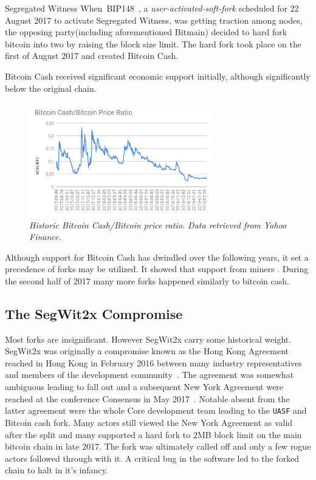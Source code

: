 Segregated Witness When~BIP148~\cite{bip:148:uasf:segwit}, a \textit{user-activated-soft-fork} scheduled for 22 August 2017 to activate Segregated Witness, was getting traction among \gls{node}s, the opposing party(including aforementioned Bitmain) decided to hard fork bitcoin into two by raising the block size limit. The hard fork took place on the first of August 2017 and created Bitcoin Cash.

Bitcoin Cash received significant economic support initially, although significantly below the original chain.

\begin{figure}[!htb]
	\hspace*{-0.7cm} 
	\centering
	\includegraphics[width=8cm]{images/Bitcoin_Cash_Bitcoin_Price_Ratio.png}
	\caption{\textit{Historic Bitcoin Cash/Bitcoin price ratio. Data retrieved from Yahoo Finance.}}
	\label{fig:bch_btc}
	\hspace*{2mm} 	
\end{figure}

Although support for Bitcoin Cash has dwindled over the following years, it set a precedence of forks may be utilized. It showed that support from miners . During the second half of 2017 many more forks happened similarly to bitcoin cash.

\subsection{The SegWit2x Compromise}

Most forks are insignificant. However SegWit2x carry some historical weight. SegWit2x was originally a compromise known as the Hong Kong Agreement reached in Hong Kong in February 2016 between many industry representatives and members of the development community~\cite{hong:kong:agreement}. The agreement was somewhat ambiguous leading to fall out and a subsequent New York Agreement were reached at the conference Consensus in May 2017~\cite{new:york:agreement}. Notable absent from the latter agreement were the whole Core development team leading to the \texttt{UASF} and Bitcoin cash fork. Many actors still viewed the New York Agreement as valid after the split and many supported a hard fork to 2MB block limit on the main bitcoin chain in late 2017. The fork was ultimately called off and only a few rogue actors followed through with it. A critical bug in the software led to the forked chain to halt in it's infancy. 

